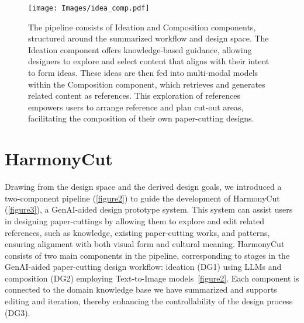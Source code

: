 
\begin{figure*}[!htbp]
\centering
\texttt{[image: Images/idea\_comp.pdf]}
\caption{\label{figure2}
The pipeline consists of Ideation and Composition components, structured around the summarized workflow and design space. The Ideation component offers knowledge-based guidance, allowing designers to explore and select content that aligns with their intent to form ideas. These ideas are then fed into multi-modal models within the Composition component, which retrieves and generates related content as references. This exploration of references empowers users to arrange reference and plan cut-out areas, facilitating the composition of their own paper-cutting designs.}
\end{figure*}

\section{HarmonyCut}\label{sec:harmonycut}
Drawing from the design space and the derived design goals, we introduced a two-component pipeline (\autoref{figure2}) to guide the development of HarmonyCut (\autoref{figure3}), a GenAI-aided design prototype system. This system can assist users in designing paper-cuttings by allowing them to explore and edit related references, such as knowledge, existing paper-cutting works, and patterns, ensuring alignment with both visual form and cultural meaning. HarmonyCut consists of two main components in the pipeline, corresponding to stages in the GenAI-aided paper-cutting design workflow: ideation (DG1) using LLMs and composition (DG2) employing Text-to-Image models~\autoref{figure2}. Each component is connected to the domain knowledge base we have summarized and supports editing and iteration, thereby enhancing the controllability of the design process (DG3).


